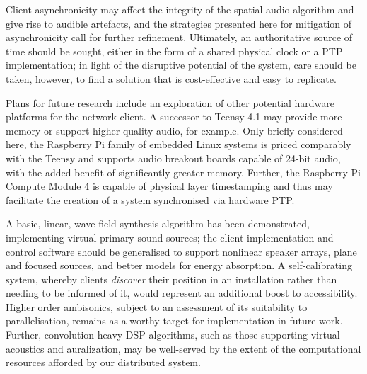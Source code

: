 \documentclass[utf8]{FrontiersinHarvard}
\begin{document}
    Client asynchronicity may affect the integrity of the spatial audio
    algorithm and give rise to audible artefacts, and the strategies presented
    here for mitigation of asynchronicity call for further refinement.
    Ultimately, an authoritative source of time should be sought, either in the
    form of a shared physical clock or a PTP implementation;
    in light of the disruptive potential of the system, care should be taken,
    however, to find a solution that is cost-effective and easy to replicate.

    Plans for future research include an exploration of other potential hardware
    platforms for the network client.
    A successor to Teensy 4.1 may provide more memory or support higher-quality
    audio, for example.
    Only briefly considered here, the Raspberry Pi family of embedded Linux
    systems is priced comparably with the Teensy and supports audio breakout
    boards capable of 24-bit audio, with the added benefit of significantly
    greater memory.
    Further, the Raspberry Pi Compute Module 4 is capable of physical layer
    timestamping and thus may facilitate the creation of a system synchronised
    via hardware PTP\@.

    A basic, linear, wave field synthesis algorithm has been demonstrated,
    implementing virtual primary sound sources;
    the client implementation and control software should be generalised to
    support nonlinear speaker arrays, plane and focused sources, and better
    models for energy absorption.
    A self-calibrating system, whereby clients \textit{discover} their position
    in an installation rather than needing to be informed of it, would represent
    an additional boost to accessibility.
    Higher order ambisonics, subject to an assessment of its suitability to
    parallelisation, remains as a worthy target for implementation in future
    work.
    Further, convolution-heavy DSP algorithms, such as those supporting virtual
    acoustics and auralization, may be well-served by the extent of the
    computational resources afforded by our distributed system.

    
    
\end{document}
